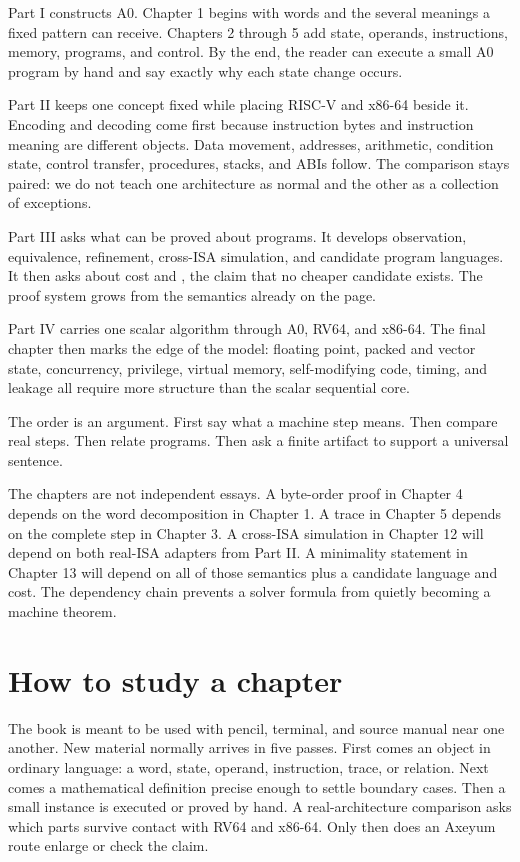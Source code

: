 Part I constructs A0. Chapter 1 begins with words and the several meanings a
fixed pattern can receive. Chapters 2 through 5 add state, operands,
instructions, memory, programs, and control. By the end, the reader can execute
a small A0 program by hand and say exactly why each state change occurs.

Part II keeps one concept fixed while placing RISC-V and x86-64 beside it.
Encoding and decoding come first because instruction bytes and instruction
meaning are different objects. Data movement, addresses, arithmetic,
condition state, control transfer, procedures, stacks, and ABIs follow. The
comparison stays paired: we do not teach one architecture as normal and the
other as a collection of exceptions.

Part III asks what can be proved about programs. It develops observation,
equivalence, refinement, cross-ISA simulation, and candidate program languages.
It then asks about cost and , the claim that no cheaper
candidate exists. The proof system grows
from the semantics already on the page.

Part IV carries one scalar algorithm through A0, RV64, and x86-64. The final
chapter then marks the edge of the model: floating point, packed and vector
state, concurrency, privilege, virtual memory, self-modifying code, timing,
and leakage all require more structure than the scalar sequential core.

The order is an argument. First say what a machine step means. Then compare
real steps. Then relate programs. Then ask a finite artifact to support a
universal sentence.

The chapters are not independent essays. A byte-order proof in Chapter 4
depends on the word decomposition in Chapter 1. A trace in Chapter 5 depends
on the complete step in Chapter 3. A cross-ISA simulation in Chapter 12 will
depend on both real-ISA adapters from Part II. A minimality statement in
Chapter 13 will depend on all of those semantics plus a candidate language and
cost. The dependency chain prevents a solver formula from quietly becoming a
machine theorem.

\section{How to study a chapter}

The book is meant to be used with pencil, terminal, and source manual near one
another. New material normally arrives in five passes. First comes an object
in ordinary language: a word, state, operand, instruction, trace, or relation.
Next comes a mathematical definition precise enough to settle boundary cases.
Then a small instance is executed or proved by hand. A real-architecture
comparison asks which parts survive contact with RV64 and x86-64. Only then
does an Axeyum route enlarge or check the claim.

